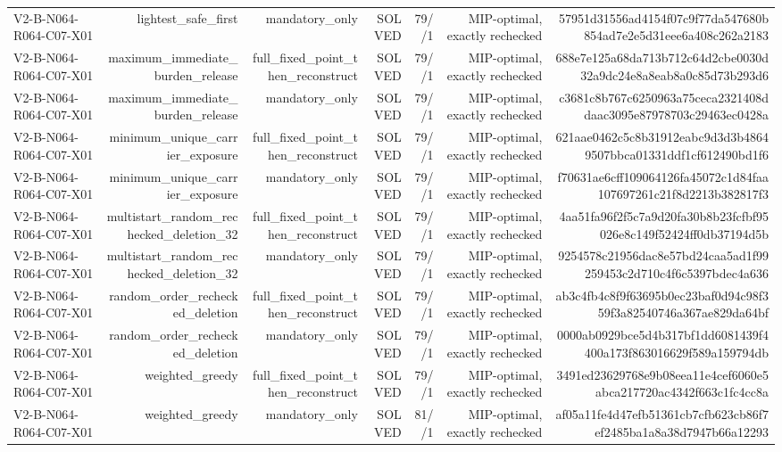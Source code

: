 {\begin{longtable}{lrrrrrr}
V2-B-N064-R064-C07-X01 & lightest\_safe\_first & mandatory\_only & SOLVED & 79//1 & MIP-optimal, exactly rechecked & 57951d31556ad4154f07c9f77da547680b854ad7e2e5d31eee6a408c262a2183 \\
V2-B-N064-R064-C07-X01 & maximum\_immediate\_burden\_release & full\_fixed\_point\_then\_reconstruct & SOLVED & 79//1 & MIP-optimal, exactly rechecked & 688e7e125a68da713b712c64d2cbe0030d32a9dc24e8a8eab8a0c85d73b293d6 \\
V2-B-N064-R064-C07-X01 & maximum\_immediate\_burden\_release & mandatory\_only & SOLVED & 79//1 & MIP-optimal, exactly rechecked & c3681c8b767c6250963a75ceca2321408ddaac3095e87978703c29463ec0428a \\
V2-B-N064-R064-C07-X01 & minimum\_unique\_carrier\_exposure & full\_fixed\_point\_then\_reconstruct & SOLVED & 79//1 & MIP-optimal, exactly rechecked & 621aae0462c5c8b31912eabc9d3d3b48649507bbca01331ddf1cf612490bd1f6 \\
V2-B-N064-R064-C07-X01 & minimum\_unique\_carrier\_exposure & mandatory\_only & SOLVED & 79//1 & MIP-optimal, exactly rechecked & f70631ae6cff109064126fa45072c1d84faa107697261c21f8d2213b382817f3 \\
V2-B-N064-R064-C07-X01 & multistart\_random\_rechecked\_deletion\_32 & full\_fixed\_point\_then\_reconstruct & SOLVED & 79//1 & MIP-optimal, exactly rechecked & 4aa51fa96f2f5c7a9d20fa30b8b23fcfbf95026e8c149f52424ff0db37194d5b \\
V2-B-N064-R064-C07-X01 & multistart\_random\_rechecked\_deletion\_32 & mandatory\_only & SOLVED & 79//1 & MIP-optimal, exactly rechecked & 9254578c21956dac8e57bd24caa5ad1f99259453c2d710c4f6c5397bdec4a636 \\
V2-B-N064-R064-C07-X01 & random\_order\_rechecked\_deletion & full\_fixed\_point\_then\_reconstruct & SOLVED & 79//1 & MIP-optimal, exactly rechecked & ab3c4fb4c8f9f63695b0ec23baf0d94c98f359f3a82540746a367ae829da64bf \\
V2-B-N064-R064-C07-X01 & random\_order\_rechecked\_deletion & mandatory\_only & SOLVED & 79//1 & MIP-optimal, exactly rechecked & 0000ab0929bce5d4b317bf1dd6081439f4400a173f863016629f589a159794db \\
V2-B-N064-R064-C07-X01 & weighted\_greedy & full\_fixed\_point\_then\_reconstruct & SOLVED & 79//1 & MIP-optimal, exactly rechecked & 3491ed23629768e9b08eea11e4cef6060e5abca217720ac4342f663c1fc4cc8a \\
V2-B-N064-R064-C07-X01 & weighted\_greedy & mandatory\_only & SOLVED & 81//1 & MIP-optimal, exactly rechecked & af05a11fe4d47efb51361cb7cfb623cb86f7ef2485ba1a8a38d7947b66a12293 \\

\end{longtable}}
